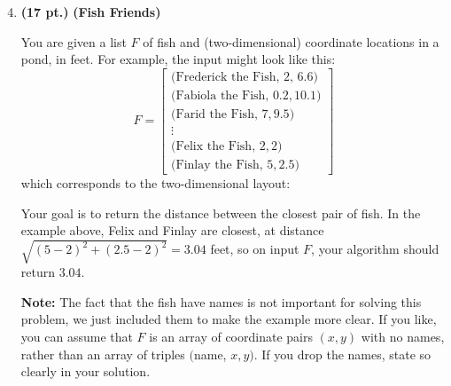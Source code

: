 \documentclass[11pt]{article}
\newcommand{\pts}[1]{\textbf{(#1 pt.)}}
\begin{document}
\begin{enumerate}
\setcounter{enumi}{3}


\item \pts{17} \textbf{(Fish Friends)} 

You are given a list $F$ of fish and (two-dimensional) coordinate locations in a pond, in feet.  For example, the input might look like this:
\[ F = \begin{bmatrix} 
\text{(Frederick the Fish, $2$, $6.6$)}\\ \text{(Fabiola the Fish, $0.2, 10.1$)}\\ \text{(Farid the Fish, $7,9.5$)} \\ \vdots \\ \text{(Felix the Fish, $2, 2$)} \\ \text{(Finlay the Fish, $5,2.5$)} \end{bmatrix} \]
which corresponds to the two-dimensional layout:
\begin{center}
\end{center}
Your goal is to return the distance between the closest pair of fish.  In the example above, Felix and Finlay are closest, at distance $\sqrt{ (5-2)^2 + (2.5 - 2)^2 } = 3.04$ feet, so on input $F$, your algorithm should return $3.04$.

\textbf{Note:} The fact that the fish have names is not important for solving this problem, we just included them to make the example more clear.  If you like, you can assume that $F$ is an array of coordinate pairs $(x,y)$ with no names, rather than an array of triples $($name, $x,y)$.  If you drop the names, state so clearly in your solution.


\end{enumerate}
\end{document}

